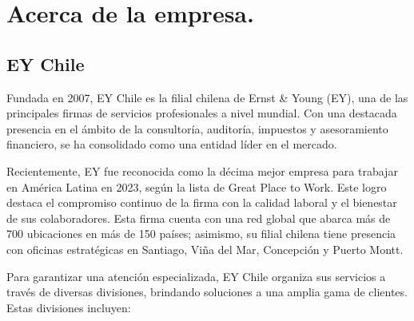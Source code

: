 \documentclass{article}[14pts]
\begin{document}
\section{Acerca de la empresa.}

  \subsection{EY Chile}

  Fundada en 2007, EY Chile es la filial chilena de Ernst \& Young (EY), una de las principales firmas de servicios 
  profesionales a nivel mundial. Con una destacada presencia en el ámbito de la consultoría, auditoría, impuestos 
  y asesoramiento financiero, se ha consolidado como una entidad líder en el mercado. 

  Recientemente, EY fue reconocida como la décima mejor empresa para trabajar en América Latina en 2023, según la 
  lista de Great Place to Work. Este logro destaca el compromiso continuo de la firma con la calidad laboral y el 
  bienestar de sus colaboradores. Esta firma cuenta con una red global que abarca más de 700 ubicaciones en más de 150 países; asimismo, su filial chilena tiene presencia con oficinas estratégicas en Santiago, Viña del Mar, Concepción y Puerto Montt.

  Para garantizar una atención especializada, EY Chile organiza sus servicios a través de diversas divisiones, 
  brindando soluciones a una amplia gama de clientes. Estas divisiones incluyen:
\end{document}
